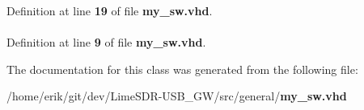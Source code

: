 Definition at line {\bf 19} of file {\bf my\+\_\+sw.\+vhd}.

\paragraph[{std\+\_\+logic\+\_\+1164}]{\hspace{0.3cm}{\ttfamily [Package]}}\label{classmy__sw_acd03516902501cd1c7296a98e22c6fcb}


Definition at line {\bf 9} of file {\bf my\+\_\+sw.\+vhd}.



The documentation for this class was generated from the following file\+:\begin{DoxyCompactItemize}
\item 
/home/erik/git/dev/\+Lime\+S\+D\+R-\/\+U\+S\+B\+\_\+\+G\+W/src/general/{\bf my\+\_\+sw.\+vhd}\end{DoxyCompactItemize}
